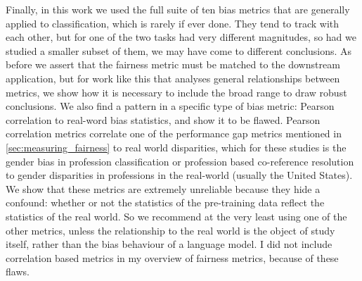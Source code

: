 Finally, in this work we used the full suite of ten bias metrics that are generally applied to classification, which is rarely if ever done. They tend to track with each other, but for one of the two tasks had very different magnitudes, so had we studied a smaller subset of them, we may have come to different conclusions. As before we assert that the fairness metric must be matched to the downstream application, but for work like this that analyses general relationships between metrics, we show how it is necessary to include the broad range to draw robust conclusions. 
We also find a pattern in a specific type of bias metric: Pearson correlation to real-word bias statistics, and show it to be flawed. Pearson correlation metrics correlate one of the performance gap metrics mentioned in \ref{sec:measuring_fairness} to real world disparities, which for these studies is the gender bias in profession classification or profession based co-reference resolution to gender disparities in professions in the real-world (usually the United States). We show that these metrics are extremely unreliable because they hide a confound: whether or not the statistics of the pre-training data reflect the statistics of the real world. So we recommend at the very least using one of the other metrics, unless the relationship to the real world is the object of study itself, rather than the bias behaviour of a language model. I did not include correlation based metrics in my overview of fairness metrics, because of these flaws. 
